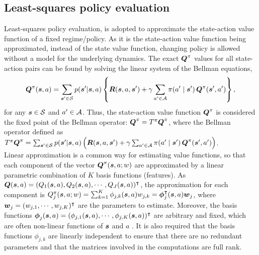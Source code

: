 \subsection{Least-squares policy evaluation}
 Least-squares policy evaluation, is adopted to approximate the state-action value function of a fixed regime/policy. As it is the state-action value function being approximated, instead of the state value function, changing policy is allowed without a model for the underlying dynamics. The exact $\boldsymbol{Q}^{\pi}$ values for all state-action pairs can be found by solving the linear system of the Bellman equations, $$\boldsymbol{Q}^{\pi}(\boldsymbol{s}, a) =\sum_{\boldsymbol{s}^{\prime} \in \mathcal{S}}  p(\boldsymbol{s}^{\prime} | \boldsymbol{s}, a) \left\{ \boldsymbol{R}(\boldsymbol{s}, a, \boldsymbol{s}^{\prime}) + \gamma \sum_{a^{\prime} \in \mathcal{A}} \pi(a^{\prime} \mid \boldsymbol{s}^{\prime} ) \,\boldsymbol{Q}^{\pi}(\boldsymbol{s}^{\prime}, a^{\prime} ) \right\},$$ for any $\boldsymbol{s} \in \mathcal{S}$ and $a^{\prime} \in \mathcal{A}$. Thus,  the state-action value function $\boldsymbol{Q}^{\pi}$ is considered the fixed point of the Bellman operator: $\boldsymbol{Q}^{\pi}=T^{\pi}\boldsymbol{Q}^{\pi}$, where the Bellman operator defined as \\  $T^{\pi}\boldsymbol{Q}^{\pi} =\sum_{\boldsymbol{s}^{\prime} \in \mathcal{S}}  p(\boldsymbol{s}^{\prime} | \boldsymbol{s}, a) \left( \boldsymbol{R}(\boldsymbol{s}, a, \boldsymbol{s}^{\prime}) + \gamma \sum_{a^{\prime} \in \mathcal{A}} \pi(a^{\prime} \mid \boldsymbol{s}^{\prime} ) \,\boldsymbol{Q}^{\pi}(\boldsymbol{s}^{\prime}, a^{\prime} ) \right)$.\\


Linear approximation is a  common way for estimating value functions, so that each component of the vector $\boldsymbol{Q}^{\pi}(\boldsymbol{s},a;w)$ are approximated by a linear parametric combination of $K$ basis functions (features). As $\boldsymbol{Q}(\boldsymbol{s},a) = (Q_1(\boldsymbol{s},a), Q_2(\boldsymbol{s},a), \cdots, Q_{J}(\boldsymbol{s},a))^{\intercal}$, the approximation for each component is $Q_j^{\pi}(\boldsymbol{s},a;w) = \sum_{k=1}^K \phi_{j,k}(\boldsymbol{s},a)w_{j,k} =  \boldsymbol{\phi}_{j}^{\intercal}(\boldsymbol{s}, a)\boldsymbol{w}_j$, where $\boldsymbol{w}_j = (w_{j,1}, \cdots, w_{j,K})^{\intercal}$ are the parameters to estimate. Moreover, the basis functions $\boldsymbol{\phi}_{j}(\boldsymbol{s}, a) = (\phi_{j,1}(\boldsymbol{s}, a), \cdots, \phi_{j,K}(\boldsymbol{s}, a))^{\intercal}$ are arbitrary and fixed, which are often non-linear functions of $\boldsymbol{s}$ and $a$ . It is also required that the basis functions $\phi_{j,k}$ are linearly independent to ensure that there are no redundant parameters and that the matrices involved in the computations are full rank. \\

